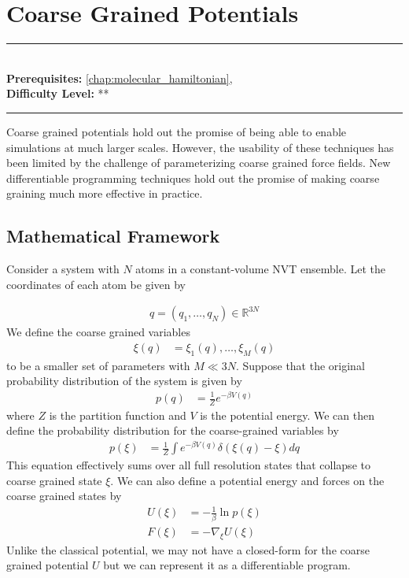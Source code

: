 \documentclass[book.tex]{subfiles}
\begin{document}
\chapter{Coarse Grained Potentials}
\label{chap:coarse}
\noindent\rule{11cm}{0.4pt} \\
\textbf{Prerequisites:}  \autoref{chap:molecular_hamiltonian},   \\
\textbf{Difficulty Level:} ** \\
\noindent\rule{11cm}{0.4pt}
\vspace{5mm}

Coarse grained potentials hold out the promise of being able to enable simulations at much larger scales. However, the usability of these techniques has been limited by the challenge of parameterizing coarse grained force fields. New differentiable programming techniques hold out the promise of making coarse graining much more effective in practice.

\section{Mathematical Framework}

Consider a system with $N$ atoms in a constant-volume NVT ensemble. Let the coordinates of each atom be given by

\begin{align}
q = (q_1,\dotsc, q_N) \in \mathbb{R}^{3N}
\end{align}
We define the coarse grained variables
\begin{align}
\xi(q) &= \xi_1(q),\dotsc,\xi_M(q)
\end{align}
to be a smaller set of parameters with $M \ll 3N$. Suppose that the original probability distribution of the system is given by
\begin{align}
p(q) &= \frac{1}{Z} e^{-\beta V(q)}
\end{align}
where $Z$ is the partition function and $V$ is the potential energy. We can then define the probability distribution for the coarse-grained variables by
\begin{align}
p(\xi) &= \frac{1}{Z} \int e^{-\beta V(q)} \delta(\xi(q) - \xi) dq
\end{align}
This equation effectively sums over all full resolution states that collapse to coarse grained state $\xi$. We can also define a potential energy and forces on the coarse grained states by
\begin{align}
U(\xi) &= -\frac{1}{\beta} \ln p(\xi) \\
F(\xi) &= - \nabla_{\xi} U(\xi)
\end{align}
Unlike the classical potential, we may not have a closed-form for the coarse grained potential $U$ but we can represent it as a differentiable program.
\end{document}

